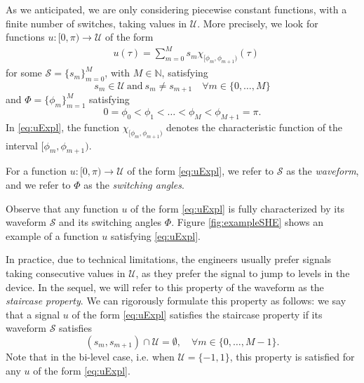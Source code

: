 \documentclass[twocolumn]{autart}    %
\begin{document}
As we anticipated,  we are only considering piecewise constant functions, with a finite number of switches, taking values in $\mathcal{U}$.
More precisely, we look for functions 
$u: [0,\pi)\to \mathcal{U}$ of the form
\begin{align}\label{eq:uExpl}
	&u (\tau)= \sum_{m=0}^M s_m\chi_{[\phi_m,\phi_{m+1})} (\tau)
\end{align}
for some $\mathcal{S} = \{ s_m\}_{m=0}^M$,  with $M\in \mathbb{N}$, satisfying
\begin{equation}\label{waveform def}
 s_m\in \mathcal{U} \ \text{and} \ s_m\neq s_{m+1} \quad \forall m\in \{0,\ldots, M\}
 \end{equation}
 and  $\Phi = \{ \phi_m\}_{m=1}^{M}$ satisfying
 \begin{equation}\label{switching angles def}
 0= \phi_0 < \phi_1 <\ldots < \phi_M < \phi_{M+1} = \pi .
\end{equation}
In \eqref{eq:uExpl}, the function $\chi_{[\phi_m,\phi_{m+1})}$ denotes the characteristic function of the interval $[\phi_m,\phi_{m+1})$.


\medskip

\begin{definition}\label{def: waveform and switching angles}
For a function $u: [0,\pi) \to \mathcal{U}$ of the form \eqref{eq:uExpl}, we refer to $\mathcal{S}$ as the \emph{waveform}, and we refer to $\Phi$ as the \emph{switching angles}.
\end{definition}

Observe that any function $u$ of the form \eqref{eq:uExpl} is fully characterized by its waveform $\mathcal{S}$ and its switching angles $\Phi$.
Figure \ref{fig:exampleSHE} shows an example of a function $u$ satisfying \eqref{eq:uExpl}. 

{\color{red}
In practice,  due to technical limitations, the engineers usually prefer signals taking consecutive values in $\mathcal{U}$, as they prefer the signal to jump to levels in the device.
In the sequel, we will refer to this property of the waveform as the \emph{staircase property}.}
We can rigorously formulate this property as follows:
we say that a signal $u$ of the form \eqref{eq:uExpl} satisfies the staircase property if its waveform $\mathcal{S}$ satisfies
\begin{equation}\label{eq:staircase prop}
(s_m , s_{m+1}) \cap \mathcal{U} = \emptyset, \quad \forall m\in \{ 0, \ldots, M-1 \}.
\end{equation}
Note that in the bi-level case, i.e. when $\mathcal{U} = \{-1,1\}$, this property is satisfied for any $u$ of the form \eqref{eq:uExpl}.
\end{document}

